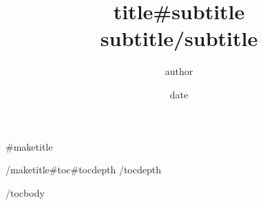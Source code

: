 \documentclass{{{latex_class_options:raw}}}{{{{latex_class:raw}}}}
\author{{{{author}}}}
\date{{{{date}}}}
\title{{{{title}}}{{{#subtitle}}}\\
\medskip
\large {{{subtitle}}}{{{/subtitle}}}}
\begin{document}
{{{#maketitle}}}\maketitle
{{{/maketitle}}}{{{#toc}}}{{{#tocdepth}}}
{{{/tocdepth}}}\tableofcontents

{{{/toc}}}{{{body}}}
\end{document}
